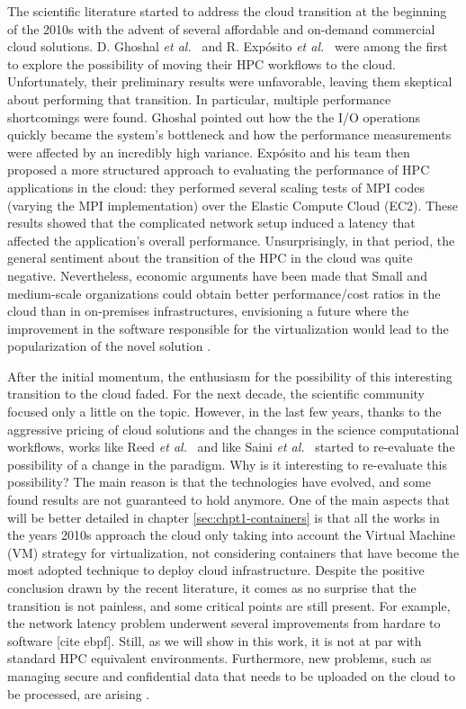 The scientific literature started to address the cloud transition at the
beginning of the 2010s with the advent of several affordable and on-demand
commercial cloud solutions. D. Ghoshal \emph{et al.}~\cite{Ghoshal2011} and  R.
Exp\'osito \emph{et al.}~\cite{exposito2013} were among the first to explore the
possibility of moving their HPC workflows to the cloud. Unfortunately, their
preliminary results were unfavorable, leaving them skeptical about performing
that transition. In particular, multiple performance shortcomings were found.
Ghoshal pointed out how the the I/O operations quickly became the system's
bottleneck and how the performance measurements were affected by an incredibly
high variance. Exp\'osito and his team then proposed a more structured approach
to evaluating the performance of HPC applications in the cloud: they performed
several scaling tests of MPI codes (varying the MPI implementation) over the
Elastic Compute Cloud (EC2). These results showed that the complicated network
setup induced a latency that affected the application's overall performance.
Unsurprisingly, in that period, the general sentiment about the transition of
the HPC in the cloud was quite negative. Nevertheless, economic arguments have
been made that Small and medium-scale organizations could obtain better
performance/cost ratios in the cloud than in on-premises infrastructures,
envisioning a future where the improvement in the software responsible for the
virtualization would lead to the popularization of the novel solution
\cite{Gupta2013}.

After the initial momentum, the enthusiasm for the possibility of this
interesting transition to the cloud faded. For the next decade, the scientific
community focused only a little on the topic. However, in the last few years,
thanks to the aggressive pricing of cloud solutions and the changes in the
science computational workflows, works like Reed \emph{et al.}~\cite{Reed2022}
and like Saini \emph{et al.}~\cite{Saini2021} started to re-evaluate the
possibility of a change in the paradigm. Why is it interesting to re-evaluate
this possibility? The main reason is that the technologies have evolved, and
some found results are not guaranteed to hold anymore\cite{Guidi_2021}. One of
the main aspects that will be better detailed in chapter
\ref{sec:chpt1-containers} is that all the works in the years 2010s approach the
cloud only taking into account the Virtual Machine (VM) strategy for
virtualization, not considering containers that have become the most adopted
technique to deploy cloud infrastructure. Despite the positive conclusion drawn
by the recent literature, it comes as no surprise that the transition is not
painless, and some critical points are still present. For example, the network
latency problem underwent several improvements from hardare\cite{Firestone_2018}
to software [cite ebpf]. Still, as we will show in this work, it is not at par
with standard HPC equivalent environments. Furthermore, new problems, such as
managing secure and confidential data that needs to be uploaded on the cloud to
be processed, are arising \cite{Keke2023}.

